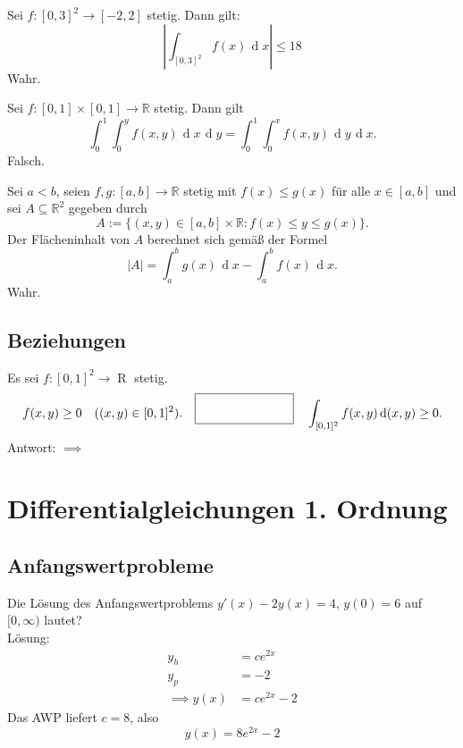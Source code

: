 \documentclass[parskip=full]{scrartcl}
\DeclareMathOperator{\diff}{\mathop{}\!\mathrm{d}}
\begin{document}
Sei $f : [0,3]^2 \to [-2,2]$ stetig.
Dann gilt:
\begin{displaymath}
  |\int_{[0,3]^2} f(x) \diff x | \leq 18
\end{displaymath}
Wahr.

Sei $f : [0,1] \times [0,1] \to \mathbb{R}$ stetig.
Dann gilt
\begin{displaymath}
  \int_0^1 \int_0^y f(x,y) \diff x \diff y = \int_0^1 \int_0^x f(x,y) \diff y \diff x.
\end{displaymath}
Falsch.

Sei $a < b$, seien $f,g : [a,b] \to \mathbb{R}$ stetig mit $f(x) \leq g(x)$ für alle $x \in [a,b]$ und sei $A \subseteq \mathbb{R}^2$ gegeben durch
\begin{displaymath}
  A := \{(x,y) \in [a,b] \times \mathbb{R} : f(x) \leq y \leq g(x)\}.
\end{displaymath}
Der Flächeninhalt von $A$ berechnet sich gemäß der Formel
\begin{displaymath}
  |A| = \int_a^b g(x) \diff x - \int_a^b f(x) \diff x.
\end{displaymath}
Wahr.

\subsection{Beziehungen}
Es sei $f : [0,1]^2 \to \mathop{R}$ stetig.
\begin{displaymath}
  f(x,y) \geq 0 \quad ((x,y) \in [0,1]^2).
  \quad \fbox{\rule{1in}{0pt}\rule[-0.5ex]{0pt}{4ex}} \quad
  \int_{[0,1]^2} f(x,y) \diff (x,y) \geq 0.
\end{displaymath}
Antwort: $\implies$

\section{Differentialgleichungen 1. Ordnung}
\subsection{Anfangswertprobleme}
Die Lösung des Anfangswertproblems $y'(x) - 2y(x) = 4$, $y(0) = 6$ auf $[0,\infty)$ lautet?\\
Lösung:
\begin{align*}
  y_h &= c e^{2x}\\
  y_p &= -2\\
  \implies y(x) &= ce^{2x} - 2
\end{align*}
Das AWP liefert $c = 8$, also
\begin{displaymath}
  y(x) = 8e^{2x} - 2
\end{displaymath}
\end{document}

